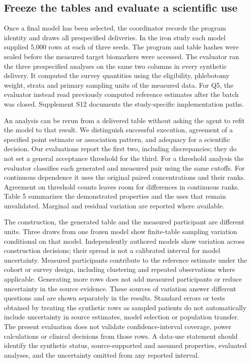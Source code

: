 \documentclass[11pt,letterpaper]{article}
\begin{document}
\subsection{Freeze the tables and evaluate a scientific use}

Once a final model has been selected, the coordinator records the program identity and draws all prespecified deliveries. In the iron study each model supplied 5,000 rows at each of three seeds. The program and table hashes were sealed before the measured target biomarkers were accessed. The evaluator ran the three prespecified analyses on the same two columns in every synthetic delivery. It computed the survey quantities using the eligibility, phlebotomy weight, strata and primary sampling units of the measured data. For Q5, the evaluator instead read previously computed reference estimates after the batch was closed. Supplement S12 documents the study-specific implementation paths.


An analysis can be rerun from a delivered table without asking the agent to refit the model to that result. We distinguish successful execution, agreement of a specified point estimate or association pattern, and adequacy for a scientific decision. Our evaluations report the first two, including discrepancies; they do not set a general acceptance threshold for the third. For a threshold analysis the evaluator classifies each generated and measured pair using the same cutoffs. For continuous dependence it uses the original paired concentrations and their ranks. Agreement on threshold counts leaves room for differences in continuous ranks. Table 5 summarizes the demonstrated properties and the uses that remain unvalidated. Marginal and residual variation are reported where available.


The construction, the generated table and the measured participant are different units. Three draws from one frozen model show finite-table sampling variation conditional on that model. Independently authored models show variation across construction decisions; their spread is not a calibrated interval for model uncertainty. Measured participants contribute to the reference estimate under the cohort or survey design, including clustering and repeated observations where applicable. Generating more rows does not add measured participants or reduce uncertainty in the source evidence. These sources of variation answer different questions and are shown separately in the results. Standard errors or tests obtained by treating the synthetic rows as sampled patients do not automatically include uncertainty in source estimates, model selection or population transfer. The present evaluation does not validate confidence-interval coverage, power calculations or clinical decisions from those rows. A data-use statement should identify the synthetic status, source-supported and assumed properties, evaluated analyses, and the uncertainty omitted from any reported interval.
\end{document}
